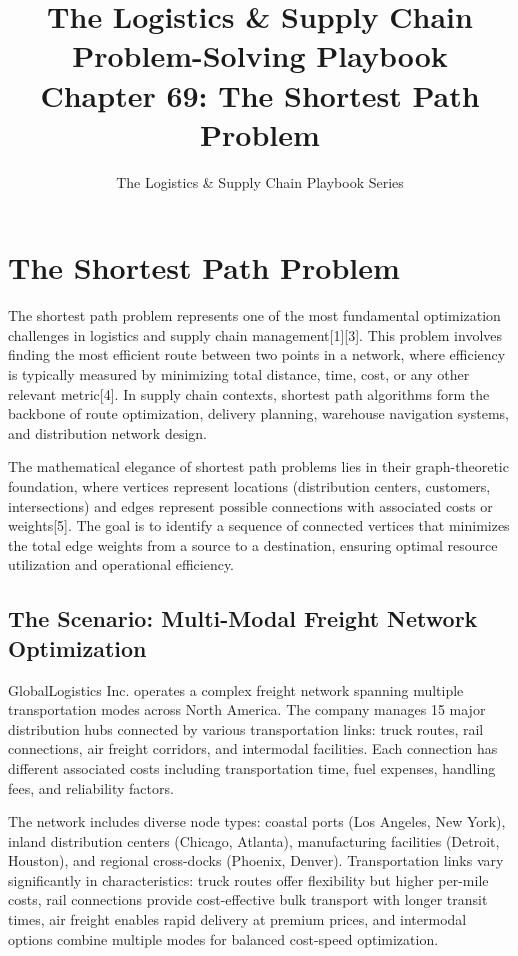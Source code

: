 \documentclass{article}
\title{The Logistics \& Supply Chain Problem-Solving Playbook\\Chapter 69: The Shortest Path Problem}
\author{The Logistics \& Supply Chain Playbook Series}
\date{}
\begin{document}
\maketitle

\section{The Shortest Path Problem}

The shortest path problem represents one of the most fundamental optimization challenges in logistics and supply chain management[1][3]. This problem involves finding the most efficient route between two points in a network, where efficiency is typically measured by minimizing total distance, time, cost, or any other relevant metric[4]. In supply chain contexts, shortest path algorithms form the backbone of route optimization, delivery planning, warehouse navigation systems, and distribution network design.

The mathematical elegance of shortest path problems lies in their graph-theoretic foundation, where vertices represent locations (distribution centers, customers, intersections) and edges represent possible connections with associated costs or weights[5]. The goal is to identify a sequence of connected vertices that minimizes the total edge weights from a source to a destination, ensuring optimal resource utilization and operational efficiency.

\subsection{The Scenario: Multi-Modal Freight Network Optimization}

GlobalLogistics Inc. operates a complex freight network spanning multiple transportation modes across North America. The company manages 15 major distribution hubs connected by various transportation links: truck routes, rail connections, air freight corridors, and intermodal facilities. Each connection has different associated costs including transportation time, fuel expenses, handling fees, and reliability factors.

The network includes diverse node types: coastal ports (Los Angeles, New York), inland distribution centers (Chicago, Atlanta), manufacturing facilities (Detroit, Houston), and regional cross-docks (Phoenix, Denver). Transportation links vary significantly in characteristics: truck routes offer flexibility but higher per-mile costs, rail connections provide cost-effective bulk transport with longer transit times, air freight enables rapid delivery at premium prices, and intermodal options combine multiple modes for balanced cost-speed optimization.
\end{document}
